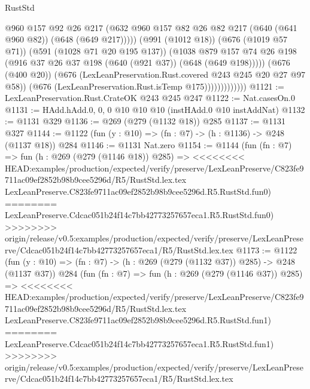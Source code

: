 \begin{lexlean}{RustStd}
\begin{coremodule}
{\begin{coremodule}
{{{{{{                                @960
                                @157
                                @92
                                @26
                                @217
                                (@632
                                  @960
                                  @157
                                  @82
                                  @26
                                  @82
                                  @217
                                  (@640 (@641 @960 @82))
                                  (@648 (@649 @217)))))
                            (@991 (@1012 @18))
                            (@676 (@1019 @57 @71))
                            (@591 (@1028 @71 @20 @195 @137))
                            (@1038
                              @879
                              @157
                              @74
                              @26
                              @198
                              (@916 @37 @26 @37 @198 (@640 (@921 @37)) (@648 (@649 @198)))))
                          (@676 (@400 @20))
                          (@676 (LexLeanPreservation.Rust.covered @243 @245 @20 @27 @97 @58))
                          (@676 (LexLeanPreservation.Rust.isTemp @175)))))))))))))
@1121 := LexLeanPreservation.Rust.CrateOK @243 @245 @247
@1122 := Nat.casesOn.{0}
@1131 := HAdd.hAdd.{0, 0, 0} @10 @10 @10 (instHAdd.{0} @10 instAddNat)
@1132 := @1131 @329
@1136 := @269 (@279 (@1132 @18)) @285
@1137 := @1131 @327
@1144 := @1122 (fun (y : @10) => (fn : @7) -> (h : @1136) -> @248 (@1137 @18)) @284
@1146 := @1131 Nat.zero
@1154 := @1144
    (fun (fn : @7) =>
    fun (h : @269 (@279 (@1146 @18)) @285) =>
<<<<<<<< HEAD:examples/production/expected/verify/preserve/LexLeanPreserve/C823fe9711ac09ef2852b98b9cee5296d/R5/RustStd.lex.tex
    LexLeanPreserve.C823fe9711ac09ef2852b98b9cee5296d.R5.RustStd.fun0)
========
    LexLeanPreserve.Cdcac051b24f14c7bb42773257657eca1.R5.RustStd.fun0)
>>>>>>>> origin/release/v0.5:examples/production/expected/verify/preserve/LexLeanPreserve/Cdcac051b24f14c7bb42773257657eca1/R5/RustStd.lex.tex
@1173 := @1122
    (fun (y : @10) => (fn : @7) -> (h : @269 (@279 (@1132 @37)) @285) -> @248 (@1137 @37))
    @284
    (fun (fn : @7) =>
    fun (h : @269 (@279 (@1146 @37)) @285) =>
<<<<<<<< HEAD:examples/production/expected/verify/preserve/LexLeanPreserve/C823fe9711ac09ef2852b98b9cee5296d/R5/RustStd.lex.tex
    LexLeanPreserve.C823fe9711ac09ef2852b98b9cee5296d.R5.RustStd.fun1)
========
    LexLeanPreserve.Cdcac051b24f14c7bb42773257657eca1.R5.RustStd.fun1)
>>>>>>>> origin/release/v0.5:examples/production/expected/verify/preserve/LexLeanPreserve/Cdcac051b24f14c7bb42773257657eca1/R5/RustStd.lex.tex
}}}}}}
\end{coremodule}}
\end{coremodule}
\end{lexlean}
